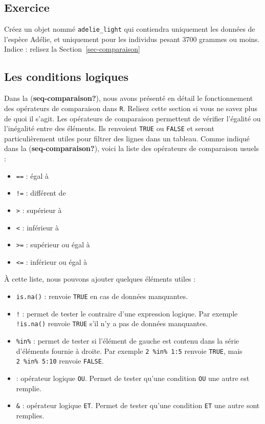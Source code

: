 \documentclass[
  letterpaper,
  DIV=11,
  numbers=noendperiod]{scrreprt}
\providecommand{\tightlist}{%
  \setlength{\itemsep}{0pt}\setlength{\parskip}{0pt}}\usepackage{longtable,booktabs,array}
\begin{document}
\hypertarget{exercice}{%
\subsection{Exercice}\label{exercice}}

Créez un objet nommé \texttt{adelie\_light} qui contiendra uniquement
les données de l'espèce Adélie, et uniquement pour les individus pesant
3700 grammes ou moins. Indice : relisez la Section~\ref{sec-comparaison}

\hypertarget{les-conditions-logiques}{%
\subsection{Les conditions logiques}\label{les-conditions-logiques}}

Dans la (\textbf{seq-comparaison?}), nous avons présenté en détail le
fonctionnement des opérateurs de comparaison dans \texttt{R}. Relisez
cette section si vous ne savez plus de quoi il s'agit. Les opérateurs de
comparaison permettent de vérifier l'égalité ou l'inégalité entre des
éléments. Ils renvoient \texttt{TRUE} ou \texttt{FALSE} et seront
particulièrement utiles pour filtrer des lignes dans un tableau. Comme
indiqué dans la (\textbf{seq-comparaison?}), voici la liste des
opérateurs de comparaison usuels :

\begin{itemize}
\tightlist
\item
  \texttt{==} : égal à
\item
  \texttt{!=} : différent de
\item
  \texttt{\textgreater{}} : supérieur à
\item
  \texttt{\textless{}} : inférieur à
\item
  \texttt{\textgreater{}=} : supérieur ou égal à
\item
  \texttt{\textless{}=} : inférieur ou égal à
\end{itemize}

À cette liste, nous pouvons ajouter quelques éléments utiles :

\begin{itemize}
\tightlist
\item
  \texttt{is.na()} : renvoie \texttt{TRUE} en cas de données manquantes.
\item
  \texttt{!} : permet de tester le contraire d'une expression logique.
  Par exemple \texttt{!is.na()} renvoie \texttt{TRUE} s'il n'y a pas de
  données manquantes.
\item
  \texttt{\%in\%} : permet de tester si l'élément de gauche est contenu
  dans la série d'éléments fournie à droite. Par exemple
  \texttt{2\ \%in\%\ 1:5} renvoie \texttt{TRUE}, mais
  \texttt{2\ \%in\%\ 5:10} renvoie \texttt{FALSE}.
\item
  \texttt{\textbar{}} : opérateur logique \texttt{OU}. Permet de tester
  qu'une condition \texttt{OU} une autre est remplie.
\item
  \texttt{\&} : opérateur logique \texttt{ET}. Permet de tester qu'une
  condition \texttt{ET} une autre sont remplies.
\end{itemize}
\end{document}
